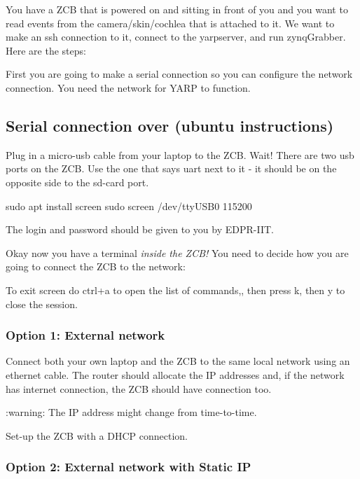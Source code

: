 You have a Z\+CB that is powered on and sitting in front of you and you want to read events from the camera/skin/cochlea that is attached to it. We want to make an {\ttfamily ssh} connection to it, connect to the {\ttfamily yarpserver}, and run {\ttfamily zynq\+Grabber}. Here are the steps\+:

First you are going to make a serial connection so you can configure the network connection. You need the network for {\ttfamily Y\+A\+RP} to function.

\subsection*{Serial connection over (ubuntu instructions)}


\begin{DoxyItemize}
\item Plug in a micro-\/usb cable from your laptop to the Z\+CB. Wait! There are two usb ports on the Z\+CB. Use the one that says uart next to it -\/ it should be on the opposite side to the sd-\/card port. 
\begin{DoxyCode}
sudo apt install screen
sudo screen /dev/ttyUSB0 115200
\end{DoxyCode}
 The login and password should be given to you by E\+D\+P\+R-\/\+I\+IT.
\end{DoxyItemize}

Okay now you have a terminal {\itshape inside the Z\+C\+B!} You need to decide how you are going to connect the Z\+CB to the network\+:

To exit {\ttfamily screen} do {\ttfamily ctrl+a} to open the list of commands,, then press {\ttfamily k}, then {\ttfamily y} to close the session.

\subsubsection*{Option 1\+: External network}

Connect both your own laptop and the Z\+CB to the same local network using an ethernet cable. The router should allocate the IP addresses and, if the network has internet connection, the Z\+CB should have connection too.

\+:warning\+: The IP address might change from time-\/to-\/time.

Set-\/up the Z\+CB with a D\+H\+CP connection.

\subsubsection*{Option 2\+: External network with Static IP}

